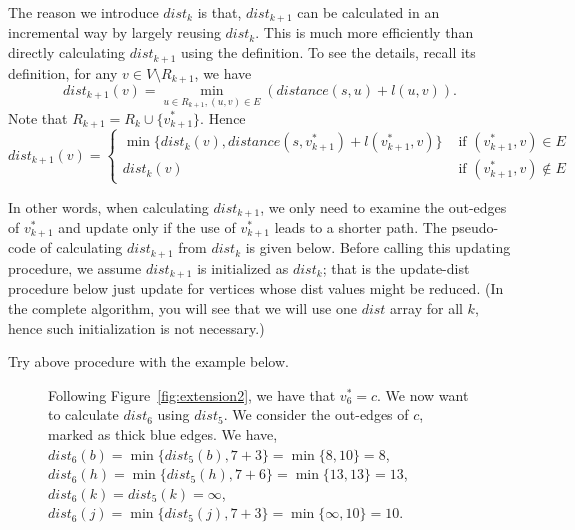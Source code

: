 The reason we introduce $dist_k$ is that, $dist_{k+1}$ can be calculated 
in an incremental way by largely reusing $dist_k$.
This is much more efficiently than directly calculating $dist_{k+1}$ using the definition. 
To see the details, recall its definition, for any $v\in V\setminus R_{k+1}$, we have 
$$dist_{k+1}(v) = \textstyle \min_{u\in R_{k+1}, (u, v)\in E} (distance(s, u) + l(u,v)).$$
Note that $R_{k+1} = R_k \cup \{v_{k+1}^*\}$. Hence
\begin{displaymath}
dist_{k+1}(v) = \left\{
\begin{array}{llllll}
\min\{ dist_k(v), distance(s, v_{k+1}^*) + l(v_{k+1}^*, v) \} & \textrm{ if } (v_{k+1}^*, v) \in E \\
dist_k(v) & \textrm{ if } (v_{k+1}^*, v) \not\in E
\end{array}
\right.
\end{displaymath}

In other words, when calculating $dist_{k+1}$, we only need to examine the out-edges of $v_{k+1}^*$
and update only if the use of $v_{k+1}^*$ leads to a shorter path. The pseudo-code of
calculating $dist_{k+1}$ from $dist_k$ is given below.
Before calling this updating procedure, we assume $dist_{k+1}$ is initialized as $dist_k$;
that is the update-dist procedure below just update for vertices whose dist values might be reduced.
(In the complete algorithm, you will see that we will use one $dist$ array for all $k$, hence such initialization is not necessary.)

\begin{minipage}{0.8\textwidth}
	\xxx
	\xxx
	\xxx
	\xxx
	\xxx
	\xxx
	\xxx
\end{minipage}

Try above procedure with the example below.

\begin{figure}[h!]
\centering{}
\caption{Following Figure~\ref{fig:extension2}, we have that $v_6^* = c$.
We now want to calculate $dist_6$ using $dist_5$. We consider the out-edges of $c$, marked as thick blue edges.
We have, 
$dist_6(b) = \min\{dist_5(b), 7 + 3\}= \min\{8, 10\} = 8$, 
$dist_6(h) = \min\{dist_5(h), 7 + 6\}= \min\{13, 13\} = 13$, 
$dist_6(k) = dist_5(k) = \infty$, 
$dist_6(j) = \min\{dist_5(j), 7 + 3\}= \min\{\infty, 10\} = 10$.  }
\label{fig:update}
\end{figure}

